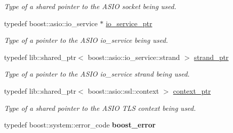 \begin{DoxyCompactItemize}
\begin{DoxyCompactList}\small\item\em Type of a shared pointer to the A\+S\+IO socket being used. \end{DoxyCompactList}\item 
typedef boost\+::asio\+::io\+\_\+service $\ast$ \hyperlink{classwebsocketpp_1_1transport_1_1asio_1_1tls__socket_1_1connection_a8758272ecf35bba1efb28a5c340d5433}{io\+\_\+service\+\_\+ptr}\hypertarget{classwebsocketpp_1_1transport_1_1asio_1_1tls__socket_1_1connection_a8758272ecf35bba1efb28a5c340d5433}{}\label{classwebsocketpp_1_1transport_1_1asio_1_1tls__socket_1_1connection_a8758272ecf35bba1efb28a5c340d5433}

\begin{DoxyCompactList}\small\item\em Type of a pointer to the A\+S\+IO io\+\_\+service being used. \end{DoxyCompactList}\item 
typedef lib\+::shared\+\_\+ptr$<$ boost\+::asio\+::io\+\_\+service\+::strand $>$ \hyperlink{classwebsocketpp_1_1transport_1_1asio_1_1tls__socket_1_1connection_a249bc9a36dd26d40b0d0f88cc5d71af3}{strand\+\_\+ptr}\hypertarget{classwebsocketpp_1_1transport_1_1asio_1_1tls__socket_1_1connection_a249bc9a36dd26d40b0d0f88cc5d71af3}{}\label{classwebsocketpp_1_1transport_1_1asio_1_1tls__socket_1_1connection_a249bc9a36dd26d40b0d0f88cc5d71af3}

\begin{DoxyCompactList}\small\item\em Type of a pointer to the A\+S\+IO io\+\_\+service strand being used. \end{DoxyCompactList}\item 
typedef lib\+::shared\+\_\+ptr$<$ boost\+::asio\+::ssl\+::context $>$ \hyperlink{classwebsocketpp_1_1transport_1_1asio_1_1tls__socket_1_1connection_a058b64956cb300b2da6f23b4663c367a}{context\+\_\+ptr}\hypertarget{classwebsocketpp_1_1transport_1_1asio_1_1tls__socket_1_1connection_a058b64956cb300b2da6f23b4663c367a}{}\label{classwebsocketpp_1_1transport_1_1asio_1_1tls__socket_1_1connection_a058b64956cb300b2da6f23b4663c367a}

\begin{DoxyCompactList}\small\item\em Type of a shared pointer to the A\+S\+IO T\+LS context being used. \end{DoxyCompactList}\item 
typedef boost\+::system\+::error\+\_\+code {\bfseries boost\+\_\+error}\hypertarget{classwebsocketpp_1_1transport_1_1asio_1_1tls__socket_1_1connection_a162eac60d6a05587b230f3ea7e448353}{}\label{classwebsocketpp_1_1transport_1_1asio_1_1tls__socket_1_1connection_a162eac60d6a05587b230f3ea7e448353}

\end{DoxyCompactItemize}
